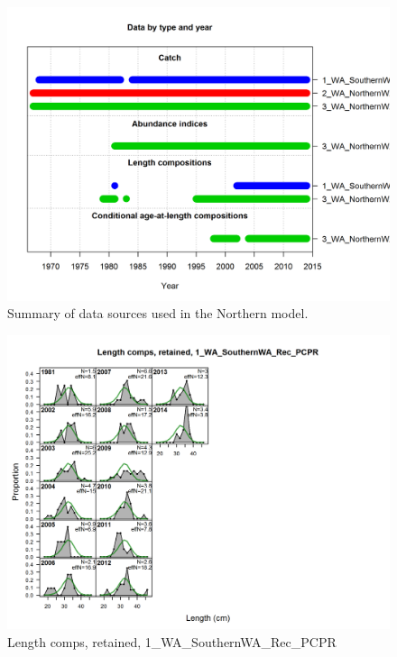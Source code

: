 \documentclass[12pt,]{article}
\begin{document}
\begin{figure}[htbp]
\centering
\includegraphics{r4ss/plots_mod1/data_plot.png}
\caption{Summary of data sources used in the Northern model.
\label{fig:data_plot}}
\end{figure}

\FloatBarrier

\FloatBarrier

\FloatBarrier

\FloatBarrier

\FloatBarrier

\FloatBarrier

\begin{figure}[htbp]
\centering
\includegraphics{./r4ss/plots_mod1/comp_lenfit_flt1mkt2.png}
\caption{Length comps, retained, 1\_WA\_SouthernWA\_Rec\_PCPR
\label{fig:mod1_1_comp_lenfit_flt1mkt2}}
\end{figure}
\end{document}
